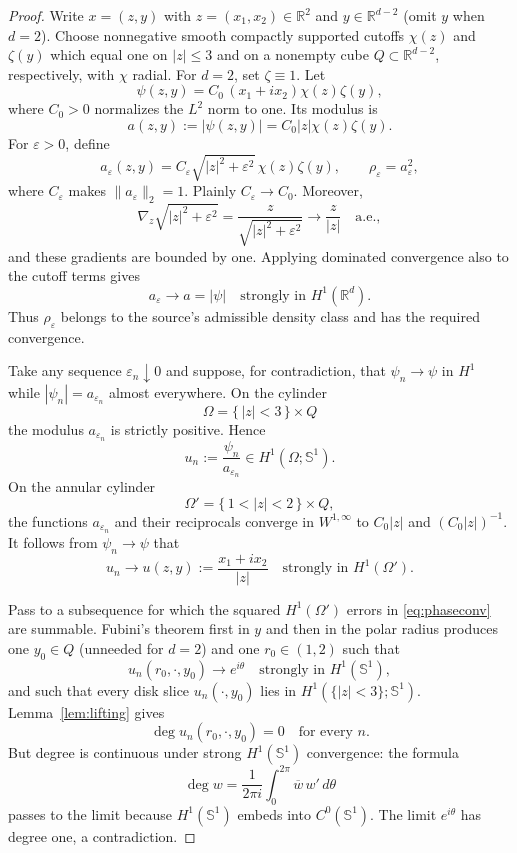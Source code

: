 \documentclass[11pt]{article}
\newcommand{\R}{\mathbb R}
\newcommand{\Sph}{\mathbb S^1}
\begin{document}
\begin{proof}
Write $x=(z,y)$ with $z=(x_1,x_2)\in\R^2$ and $y\in\R^{d-2}$ (omit $y$ when $d=2$).  Choose nonnegative smooth compactly supported cutoffs $\chi(z)$ and $\zeta(y)$ which equal one on $|z|\leq3$ and on a nonempty cube $Q\subset\R^{d-2}$, respectively, with $\chi$ radial.  For $d=2$, set $\zeta\equiv1$.  Let
\[
 \psi(z,y)=C_0\,(x_1+i x_2)\chi(z)\zeta(y),
\]
where $C_0>0$ normalizes the $L^2$ norm to one.  Its modulus is
\[
 a(z,y):=|\psi(z,y)|=C_0|z|\chi(z)\zeta(y).
\]
For $\varepsilon>0$, define
\[
 a_\varepsilon(z,y)=C_\varepsilon
 \sqrt{|z|^2+\varepsilon^2}\,\chi(z)\zeta(y),
 \qquad \rho_\varepsilon=a_\varepsilon^2,
\]
where $C_\varepsilon$ makes $\|a_\varepsilon\|_2=1$.  Plainly $C_\varepsilon\to C_0$.  Moreover,
\[
 \nabla_z\sqrt{|z|^2+\varepsilon^2}
 =\frac{z}{\sqrt{|z|^2+\varepsilon^2}}\longrightarrow\frac z{|z|}
 \quad\text{a.e.},
\]
and these gradients are bounded by one.  Applying dominated convergence also to the cutoff terms gives
\begin{equation}\label{eq:H1root}
 a_\varepsilon\longrightarrow a=|\psi|\quad\text{strongly in }H^1(\R^d).
\end{equation}
Thus $\rho_\varepsilon$ belongs to the source's admissible density class and has the required convergence.

Take any sequence $\varepsilon_n\downarrow0$ and suppose, for contradiction, that $\psi_n\to\psi$ in $H^1$ while $|\psi_n|=a_{\varepsilon_n}$ almost everywhere.  On the cylinder
\[
 \Omega=\{\,|z|<3\,\}\times Q
\]
the modulus $a_{\varepsilon_n}$ is strictly positive.  Hence
\[
 u_n:=\frac{\psi_n}{a_{\varepsilon_n}}\in H^1(\Omega;\Sph).
\]
On the annular cylinder
\[
 \Omega'=\{\,1<|z|<2\,\}\times Q,
\]
the functions $a_{\varepsilon_n}$ and their reciprocals converge in $W^{1,\infty}$ to $C_0|z|$ and $(C_0|z|)^{-1}$.  It follows from $\psi_n\to\psi$ that
\begin{equation}\label{eq:phaseconv}
 u_n\longrightarrow u(z,y):=\frac{x_1+i x_2}{|z|}
 \quad\text{strongly in }H^1(\Omega').
\end{equation}

Pass to a subsequence for which the squared $H^1(\Omega')$ errors in \eqref{eq:phaseconv} are summable.  Fubini's theorem first in $y$ and then in the polar radius produces one $y_0\in Q$ (unneeded for $d=2$) and one $r_0\in(1,2)$ such that
\[
 u_n(r_0,\cdot,y_0)\longrightarrow e^{i\theta}
 \quad\text{strongly in }H^1(\Sph),
\]
and such that every disk slice $u_n(\cdot,y_0)$ lies in $H^1(\{|z|<3\};\Sph)$.  Lemma~\ref{lem:lifting} gives
\[
 \deg u_n(r_0,\cdot,y_0)=0
 \quad\text{for every }n.
\]
But degree is continuous under strong $H^1(\Sph)$ convergence: the formula
\[
 \deg w=\frac{1}{2\pi i}\int_{0}^{2\pi}\overline w\,w'\,d\theta
\]
passes to the limit because $H^1(\Sph)$ embeds into $C^0(\Sph)$.  The limit $e^{i\theta}$ has degree one, a contradiction.


\end{proof}
\end{document}
